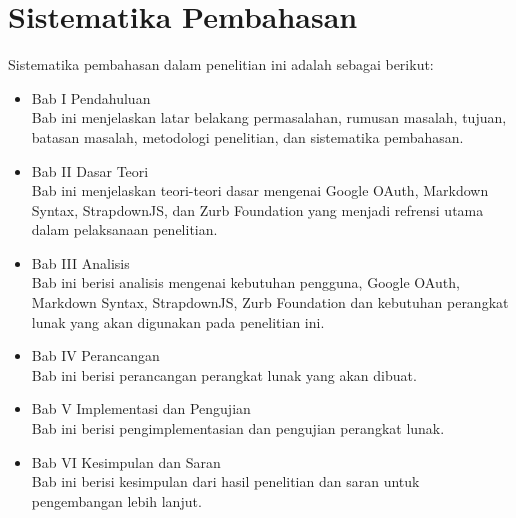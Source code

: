 \section{Sistematika Pembahasan}
Sistematika pembahasan dalam penelitian ini adalah sebagai berikut:
\begin{itemize}
	\item Bab I Pendahuluan\\
	Bab ini menjelaskan latar belakang permasalahan, rumusan masalah, tujuan, batasan masalah, metodologi penelitian, dan sistematika pembahasan.
	\item Bab II Dasar Teori\\
	Bab ini menjelaskan teori-teori dasar mengenai Google OAuth, Markdown Syntax, StrapdownJS, dan Zurb Foundation yang menjadi refrensi utama dalam pelaksanaan penelitian.
	\item Bab III Analisis\\
	Bab ini berisi analisis mengenai kebutuhan pengguna, Google OAuth, Markdown Syntax, StrapdownJS, Zurb Foundation dan kebutuhan perangkat lunak yang akan digunakan pada penelitian ini.
	\item Bab IV Perancangan\\
	Bab ini berisi perancangan perangkat lunak yang akan dibuat.
	\item Bab V Implementasi dan Pengujian\\
	Bab ini berisi pengimplementasian dan pengujian perangkat lunak.
	\item Bab VI Kesimpulan dan Saran\\
	Bab ini berisi kesimpulan dari hasil penelitian dan saran untuk pengembangan lebih lanjut.
\end{itemize}